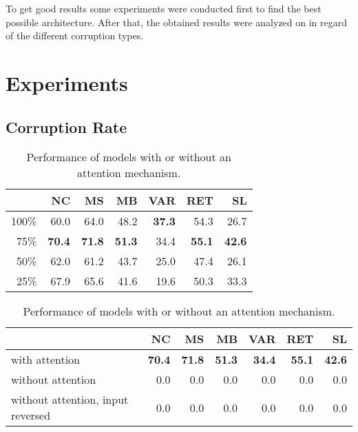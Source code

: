 To get good results some experiments were conducted first to find the best possible architecture. After that, the obtained results were analyzed on in regard of the different corruption types.

\section{Experiments}

\subsection{Corruption Rate}

\begin{table}[t]
\begin{subtable}{\linewidth}\centering
{\begin{tabular}{ | r | r |r | r | r | r |r | }
  \hline
  & NC & MS & MB & VAR & RET & SL \\
  \hline
  \hline
  100\% & 60.0 & 64.0 & 48.2 & \textbf{37.3} & 54.3 & 26.7 \\
  \hline
  75\% & \textbf{70.4} & \textbf{71.8} & \textbf{51.3} & 34.4 & \textbf{55.1} & \textbf{42.6} \\
  \hline
  50\% & 62.0 & 61.2 & 43.7 & 25.0 & 47.4 & 26.1 \\
  \hline
  25\% & 67.9 & 65.6 & 41.6 & 19.6 & 50.3 & 33.3 \\
  \hline
\end{tabular}}
\caption{Performance of models with different corruption rates.}\label{corruption_rate_table}
\end{subtable}
\newline
\vspace*{5mm}
\newline
\begin{subtable}{\linewidth}\centering
{\begin{tabular}{ | m{3cm} | r | r | r | r | r | r | }
  \hline
  & NC & MS & MB & VAR & RET & SL \\
  \hline
  \hline
  with attention & \textbf{70.4} & \textbf{71.8} & \textbf{51.3} & \textbf{34.4} & \textbf{55.1} & \textbf{42.6} \\
  \hline
  without attention & 0.0 & 0.0 & 0.0 & 0.0 & 0.0 & 0.0 \\
  \hline
  without attention, input reversed & 0.0 & 0.0 & 0.0 & 0.0 & 0.0 & 0.0 \\
  \hline
\end{tabular}}
\caption{Performance of models with or without an attention mechanism.}\label{attention_mechanism_table}

\end{subtable}
\end{table}
